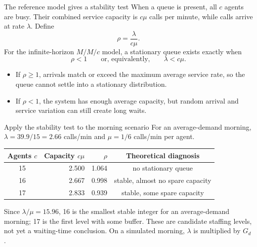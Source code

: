 \documentclass{beamer}
\begin{document}
\begin{frame}{The reference model gives a stability test}
  \small
  When a queue is present, all $c$ agents are busy. Their combined service
  capacity is $c\mu$ calls per minute, while calls arrive at rate $\lambda$.
  Define
  \[
    \rho=\frac{\lambda}{c\mu}.
  \]
  For the infinite-horizon $M/M/c$ model, a stationary queue exists exactly when
  \[
    \rho<1 \qquad\text{or, equivalently,}\qquad \lambda<c\mu.
  \]

  \vspace{0.7em}
  \begin{itemize}
    \item If $\rho\ge 1$, arrivals match or exceed the maximum average service rate, so the queue cannot settle into a stationary distribution.
    \item If $\rho<1$, the system has enough average capacity, but random arrival and service variation can still create long waits.
  \end{itemize}
\end{frame}

\begin{frame}{Apply the stability test to the morning scenario}
  \small
  For an average-demand morning,
  $\lambda=39.9/15=2.66$ calls/min and $\mu=1/6$ calls/min per agent.

  \vspace{0.7em}
  \centering
  \begin{tabular}{@{}crrc@{}}
    \toprule
    Agents $c$ & Capacity $c\mu$ & $\rho$ & Theoretical diagnosis\\
    \midrule
    15 & 2.500 & 1.064 & no stationary queue\\
    16 & 2.667 & 0.998 & stable, almost no spare capacity\\
    17 & 2.833 & 0.939 & stable, some spare capacity\\
    \bottomrule
  \end{tabular}

  \raggedright
  \vspace{0.8em}
  Since $\lambda/\mu=15.96$, 16 is the smallest stable integer for an
  average-demand morning; 17 is the first level with some buffer. These are
  candidate staffing levels, not yet a waiting-time conclusion. On a simulated
  morning, $\lambda$ is multiplied by $G_d$.
\end{frame}
\end{document}
